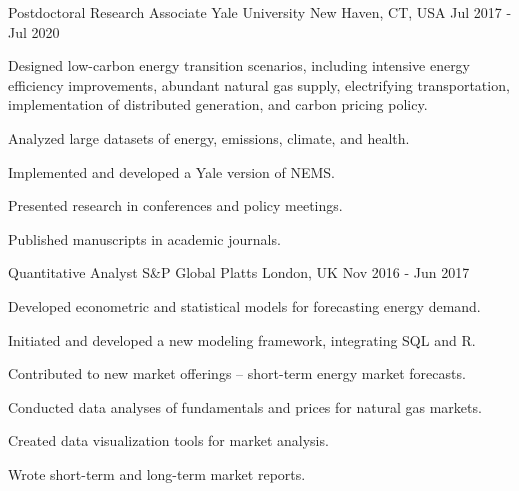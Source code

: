 \begin{cventries}
    \cventry
    {Postdoctoral Research Associate} %
    {Yale University} %
    {New Haven, CT, USA} %
    {Jul 2017 - Jul 2020} %
    {
        \begin{cvitems} %
            \item {Designed low-carbon energy transition scenarios, including intensive energy efficiency improvements, abundant natural gas supply, electrifying transportation, implementation of distributed generation, and carbon pricing policy.}
            \item {Analyzed large datasets of energy, emissions, climate, and health.}
            \item {Implemented and developed a Yale version of NEMS.}
            \item {Presented research in conferences and policy meetings.}
            \item {Published manuscripts in academic journals.}
        \end{cvitems}
    }

    \cventry
    {Quantitative Analyst} %
    {S\&P Global Platts} %
    {London, UK} %
    {Nov 2016 - Jun 2017} %
    {
        \begin{cvitems} %
            \item {Developed econometric and statistical models for forecasting energy demand.}
            \item {Initiated and developed a new modeling framework, integrating SQL and R.}
            \item {Contributed to new market offerings -- short-term energy market forecasts.}
            \item {Conducted data analyses of fundamentals and prices for natural gas markets.}
            \item {Created data visualization tools for market analysis.}
            \item {Wrote short-term and long-term market reports.}
        \end{cvitems}
    }


\end{cventries}
